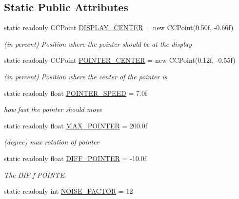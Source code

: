 \subsection*{Static Public Attributes}
\begin{DoxyCompactItemize}
\item 
static readonly C\+C\+Point \hyperlink{classClient_1_1Common_1_1Constants_1_1HUD_1_1Energy_ac1fbcbb6f266711bfc24c1280866bfaa}{D\+I\+S\+P\+L\+A\+Y\+\_\+\+C\+E\+N\+T\+E\+R} = new C\+C\+Point(0.\+50f, -\/0.\+66f)
\begin{DoxyCompactList}\small\item\em (in percent) Position where the pointer should be at the display \end{DoxyCompactList}\item 
static readonly C\+C\+Point \hyperlink{classClient_1_1Common_1_1Constants_1_1HUD_1_1Energy_ab3208382fd1803f0c43bfea1f41209eb}{P\+O\+I\+N\+T\+E\+R\+\_\+\+C\+E\+N\+T\+E\+R} = new C\+C\+Point(0.\+12f, -\/0.\+55f)
\begin{DoxyCompactList}\small\item\em (in percent) Position where the center of the pointer is \end{DoxyCompactList}\item 
static readonly float \hyperlink{classClient_1_1Common_1_1Constants_1_1HUD_1_1Energy_aad92c444ade505f6d5b888d1a158df0b}{P\+O\+I\+N\+T\+E\+R\+\_\+\+S\+P\+E\+E\+D} = 7.\+0f
\begin{DoxyCompactList}\small\item\em how fast the pointer should move \end{DoxyCompactList}\item 
static readonly float \hyperlink{classClient_1_1Common_1_1Constants_1_1HUD_1_1Energy_adc5731789a04820f7ff7031687f45427}{M\+A\+X\+\_\+\+P\+O\+I\+N\+T\+E\+R} = 200.\+0f
\begin{DoxyCompactList}\small\item\em (degree) max rotation of pointer \end{DoxyCompactList}\item 
static readonly float \hyperlink{classClient_1_1Common_1_1Constants_1_1HUD_1_1Energy_a76f90c964a89ef1b996a17137a3d6518}{D\+I\+F\+F\+\_\+\+P\+O\+I\+N\+T\+E\+R} = -\/10.\+0f
\begin{DoxyCompactList}\small\item\em The D\+I\+F f P\+O\+I\+N\+T\+E. \end{DoxyCompactList}\item 
static readonly int \hyperlink{classClient_1_1Common_1_1Constants_1_1HUD_1_1Energy_a5e84260f9c2817e8da7770afb26da087}{N\+O\+I\+S\+E\+\_\+\+F\+A\+C\+T\+O\+R} = 12

\end{DoxyCompactItemize}
